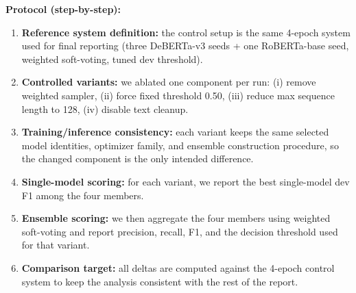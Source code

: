 \documentclass[11pt, a4paper]{article}
\begin{document}
\newpage
\textbf{Protocol (step-by-step):}
\begin{enumerate}[leftmargin=*]
  \item \textbf{Reference system definition:} the control setup is the same 4-epoch system used for final reporting (three DeBERTa-v3 seeds + one RoBERTa-base seed, weighted soft-voting, tuned dev threshold).
  \item \textbf{Controlled variants:} we ablated one component per run: (i) remove weighted sampler, (ii) force fixed threshold 0.50, (iii) reduce max sequence length to 128, (iv) disable text cleanup.
  \item \textbf{Training/inference consistency:} each variant keeps the same selected model identities, optimizer family, and ensemble construction procedure, so the changed component is the only intended difference.
  \item \textbf{Single-model scoring:} for each variant, we report the best single-model dev F1 among the four members.
  \item \textbf{Ensemble scoring:} we then aggregate the four members using weighted soft-voting and report precision, recall, F1, and the decision threshold used for that variant.
  \item \textbf{Comparison target:} all deltas are computed against the 4-epoch control system to keep the analysis consistent with the rest of the report.
\end{enumerate}

\begin{table}[H]
  \centering
  \small
  \caption{Task 1 ablation summary under the 4-epoch study setting. Deltas are relative to the control row.}
  \label{tab:ablation_task1}
\end{table}
\end{document}
